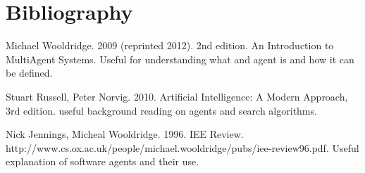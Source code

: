 \documentclass{article}
\begin{document}
\newpage
\section{Bibliography}

Michael Wooldridge. 2009 (reprinted 2012). 2nd edition. An Introduction to MultiAgent Systems. 
Useful for understanding what and agent is and how it can be defined.
\bigbreak

Stuart Russell, Peter Norvig. 2010. Artificial Intelligence: A Modern Approach, 3rd edition.
useful background reading on agents and search algorithms.
\bigbreak

Nick Jennings, Micheal Wooldridge. 1996. IEE Review. http://www.cs.ox.ac.uk/people/michael.wooldridge/pubs/iee-review96.pdf.
Useful explanation of software agents and their use.
\end{document}
